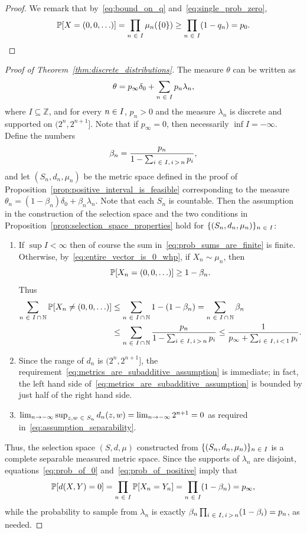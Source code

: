 \documentclass[AHL,Unicode]{cedram}
\newcommand*\n{\mathbb{N}}
\newcommand*\z{\mathbb{Z}}
\newcommand*\p{\mathbb{P}}
\newcommand*\intersect{\cap}
\let\originalleft\left
\let\originalright\right
\renewcommand{\left}{\mathopen{}\mathclose\bgroup\originalleft}
\renewcommand{\right}{\aftergroup\egroup\originalright}
\renewcommand*{\to}{\mathchoice{\longrightarrow}{\rightarrow}{\rightarrow}{\rightarrow}}
\let\oldin\in
\renewcommand{\in}{\mathchoice{\oldin}{\oldin}{\,\oldin\,}{\,\oldin\,}}
\begin{document}
\begin{proof}
We remark that by~\eqref{eq:bound_on_q} and~\eqref{eq:single_prob_zero},
\begin{equation}\label{eq:entire_vector_is_0_whp}
\p\left[X=\left(0,0,\ldots\right)\right]=\prod_{n\in I}\mu_{n}\left(\left\{ 0\right\} \right)\geq\prod_{n\in I}\left(1-q_{n}\right)=p_{0}.\qedhere
\end{equation}
\end{proof}
\begin{proof}[Proof of Theorem~\ref{thm:discrete_distributions}]\label{prfTheo1.1}
The measure $\theta$ can be written as
\[
\theta=p_{\infty}\delta_{0}+\sum_{n\in I}p_{n}\lambda_{n},
\]
where $I\subseteq\z$, and for every $n\in I$, $p_{n}>0$ and the measure $\lambda_{n}$ is discrete and supported on $(2^{n},2^{n+1}]$. Note that if $p_{\infty}=0$, then necessarily $\inf I=-\infty$. Define the numbers
\[
\beta_{n}=\frac{p_{n}}{1-\sum_{i\in I,\,i\,>\,n}p_{i}},
\]
and let $(S_{n},d_{n},\mu_{n})$ be the metric space defined in the proof of Proposition~\ref{prop:positive_interval_is_feasible} corresponding to the measure $\theta_{n}=(1-\beta_{n})\delta_{0}+\beta_{n}\lambda_{n}$. Note that each $S_{n}$ is countable. Then the assumption in the construction of the selection space and the two conditions in Proposition~\ref{prop:selection_space_properties} hold for $\{(S_{n},d_{n},\mu_{n})\} _{n\in I}$:
\begin{enumerate}
\item If $\sup I<\infty$ then of course the sum in~\eqref{eq:prob_sums_are_finite} is finite. Otherwise, by~\eqref{eq:entire_vector_is_0_whp}, if $X_{n}\sim\mu_{n}$, then
\[
\p\left[X_{n}=\left(0,0,\ldots\right)\right]\geq1-\beta_{n}.
\]
Thus
\begin{align*}
\sum_{n\in I\,\intersect\,\n} \p\left[X_{n}\neq\left(0,0,\ldots\right)\right]&\leq\sum_{n\in I\,\intersect\,\n}1-\left(1-\beta_{n}\right) =\sum_{n\in I\,\intersect\,\n}\beta_{n} \\ &\leq\sum_{n\in I\,\intersect\,\n}\frac{p_{n}}{1-\sum_{i\in I,\,i\,>\,n}p_{i}}\leq\frac{1}{p_{\infty}+\sum_{i\in I,\,i\,<\,1}p_{i}}.
\end{align*}
\item Since the range of $d_{n}$ is $(2^{n},2^{n+1}]$, the requirement~\eqref{eq:metrics_are_subadditive_assumption} is immediate; in fact, the left hand side of~\eqref{eq:metrics_are_subadditive_assumption} is bounded by just half of the right hand side.
\item $\lim_{n\to-\infty}\sup_{z,w\in S_{n}}d_{n}(z,w)=\lim_{n\to-\infty}2^{n+1}=0$ as required in~\eqref{eq:assumption_separability}.
\end{enumerate}
Thus, the selection space $(S,d,\mu)$ constructed from $\{(S_{n},d_{n},\mu_{n})\} _{n\in I}$ is a complete separable measured metric space. Since the supports of $\lambda_{n}$ are disjoint, equations~\eqref{eq:prob_of_0} and~\eqref{eq:prob_of_positive} imply that
\[
\p\left[d\left(X,Y\right)=0\right]=\prod_{n\in I}\p\left[X_{n}=Y_{n}\right]=\prod_{n\in I}\left(1-\beta_{n}\right)=p_{\infty},
\]
while the probability to sample from $\lambda_{n}$ is exactly $\beta_{n}\prod_{i\in I,\,i\,>\,n}(1-\beta_{i})=p_{n}$, as needed.
\end{proof}
\end{document}
